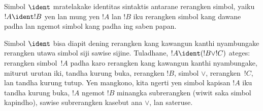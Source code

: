 \documentclass[../../../include/open-logic-section]{subfiles}
\begin{document}
\begin{defn}
Simbol $\ident$ mratelakake identitas sintaktis antarane rerangken
simbol, yaiku $!A \ident !B$ yen lan mung yen $!A$ lan $!B$ iku
rerangken simbol kang dawane padha lan ngemot simbol kang padha ing
saben papan.
\end{defn}

Simbol $\ident$ bisa diapit dening rerangken kang kawangun kanthi
nyambungake rerangken utawa simbol siji sawise sijine. Tuladhane,
$!A \ident (!B \lor !C)$ ateges: rerangken simbol~$!A$ padha karo
rerangken kang kawangun kanthi nyambungake, miturut urutan iki, tandha
kurung buka, rerangken $!B$, simbol $\lor$, rerangken~$!C$, lan tandha
kurung tutup. Yen mangkono, kita ngerti yen simbol kapisan $!A$ iku
tandha kurung buka, $!A$ ngemot $!B$ minangka subrerangken (wiwit saka
simbol kapindho), sawise subrerangken kasebut ana $\lor$, lan sateruse.
\end{document}
